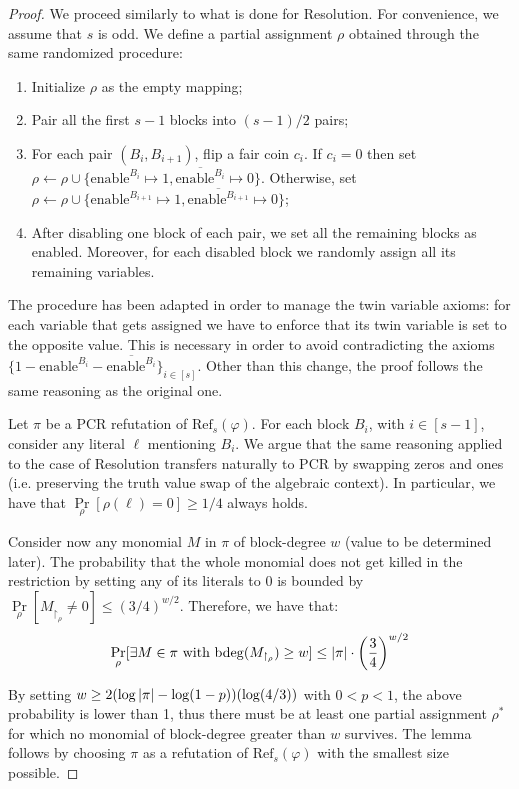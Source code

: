 \begin{proof}
    We proceed similarly to what is done for Resolution. For convenience, we assume that $s$ is odd. We define a partial assignment $\rho$ obtained through the same randomized procedure:
    \begin{enumerate}[nosep]
        \item Initialize $\rho$ as the empty mapping;
        \item Pair all the first $s-1$ blocks into $(s-1)/2$ pairs;
        \item For each pair $(B_i, B_{i+1})$, flip a fair coin $c_i$. If $c_i = 0$ then set $\rho \gets \rho \cup \{\mathrm{enable}^{B_i} \mapsto 1, \overline{\mathrm{enable}^{B_i}} \mapsto 0\}$. Otherwise, set $\rho \gets \rho \cup \{\mathrm{enable}^{B_{i+1}} \mapsto 1, \overline{\mathrm{enable}^{B_{i+1}}} \mapsto 0\}$;
        \item After disabling one block of each pair, we set all the remaining blocks as enabled. Moreover, for each disabled block we randomly assign all its remaining variables.
    \end{enumerate}

    The procedure has been adapted in order to manage the twin variable axioms: for each variable that gets assigned we have to enforce that its twin variable is set to the opposite value. This is necessary in order to avoid contradicting the axioms $\{1-\mathrm{enable}^{B_i}-\overline{\mathrm{enable}^{B_i}}\}_{i \in [s]}$. Other than this change, the proof follows the same reasoning as the original one.

    Let $\pi$ be a PCR refutation of $\mathrm{Ref}_s(\varphi)$. For each block $B_i$, with $i \in [s-1]$, consider any literal $\ell$ mentioning $B_i$. We argue that the same reasoning applied to the case of Resolution transfers naturally to PCR by swapping zeros and ones (i.e. preserving the truth value swap of the algebraic context). In particular, we have that $\Pr\limits_{\rho}[\rho(\ell) = 0] \geq 1/4$ always holds.

    Consider now any monomial $M$ in $\pi$ of block-degree $w$ (value to be determined later). The probability that the whole monomial does not get killed in the restriction by setting any of its literals to 0 is bounded by $\Pr\limits_{\rho}[M_{\upharpoonright_{\rho}} \neq 0] \leq (3/4)^{w/2}$. Therefore, we have that:
    \begin{equation}
        \Pr\limits_{\rho}[\exists M \in \pi \text{ with } \mathrm{bdeg}(M_{\upharpoonright_\rho}) \geq w] \leq \left|\pi\right| \cdot \left ( \frac{3}{4} \right )^{w/2}
    \end{equation}
    
    By setting $w \geq 2(\log \left|\pi\right| - \log (1-p))(\log(4/3))$ with $0 < p < 1$, the above probability is lower than 1, thus there must be at least one partial assignment $\rho^*$ for which no monomial of block-degree greater than $w$ survives. The lemma follows by choosing $\pi$ as a refutation of $\mathrm{Ref}_s(\varphi)$ with the smallest size possible.
\end{proof}


